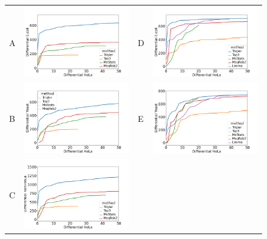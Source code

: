 \documentclass[11pt]{article}
\begin{document}
\begin{figure}[hbt]
    \centering
    \begin{tabular}{lclc} 
        A & \includegraphics[width=0.4\linewidth]{../../result/report_plots_pipeline/diff_HeLa_vs_nonHeLa_ID_ecoli_0.51.png} & 
        D & \includegraphics[width=0.4\linewidth]{../../result/report_plots_pipeline/diff_HeLa_vs_nonHeLa_PS_ecoli_0.51_Limma.png} \\ 
        B & \includegraphics[width=0.4\linewidth]{../../result/report_plots_pipeline/diff_HeLa_vs_nonHeLa_ID_yeast_0.51.png} & 
        E & \includegraphics[width=0.4\linewidth]{../../result/report_plots_pipeline/diff_HeLa_vs_nonHeLa_PS_yeast_0.51_Limma.png} \\
        C & \includegraphics[width=0.4\linewidth]{../../result/report_plots_pipeline/diff_HeLa_vs_nonHeLa_ID_all_0.51.png} & 

\end{tabular}
\end{figure}
\end{document}
